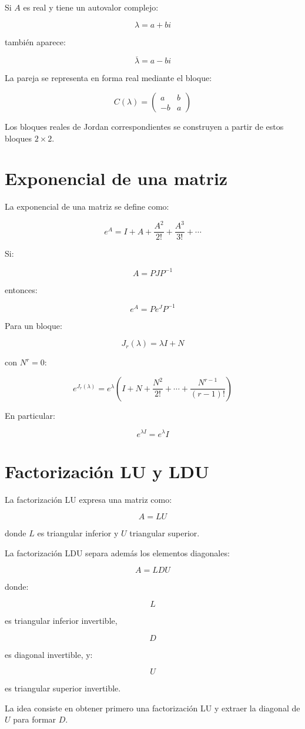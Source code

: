 \documentclass[11pt,a4paper]{article}
\begin{document}
Si $A$ es real y tiene un autovalor complejo:

\[
\lambda=a+bi
\]

también aparece:

\[
\overline{\lambda}=a-bi
\]

La pareja se representa en forma real mediante el bloque:

\[
\boxed{
C(\lambda)
=
\begin{pmatrix}
a&b\\
-b&a
\end{pmatrix}
}
\]

Los bloques reales de Jordan correspondientes se construyen a partir de estos bloques $2\times2$.

\section{Exponencial de una matriz}

La exponencial de una matriz se define como:

\[
\boxed{
e^A
=
I+A+\frac{A^2}{2!}
+\frac{A^3}{3!}
+\cdots
}
\]

Si:

\[
A=PJP^{-1}
\]

entonces:

\[
\boxed{
e^A
=
Pe^JP^{-1}
}
\]

Para un bloque:

\[
J_r(\lambda)
=
\lambda I+N
\]

con $N^r=0$:

\[
\boxed{
e^{J_r(\lambda)}
=
e^\lambda
\left(
I+N+\frac{N^2}{2!}
+\cdots+
\frac{N^{r-1}}{(r-1)!}
\right)
}
\]

En particular:

\[
e^{\lambda I}=e^\lambda I
\]

\section{Factorización LU y LDU}

La factorización LU expresa una matriz como:

\[
\boxed{
A=LU
}
\]

donde $L$ es triangular inferior y $U$ triangular superior.

La factorización LDU separa además los elementos diagonales:

\[
\boxed{
A=LDU
}
\]

donde:

\[
L
\]

es triangular inferior invertible,

\[
D
\]

es diagonal invertible, y:

\[
U
\]

es triangular superior invertible.

La idea consiste en obtener primero una factorización LU y extraer la diagonal de $U$ para formar $D$.
\end{document}
